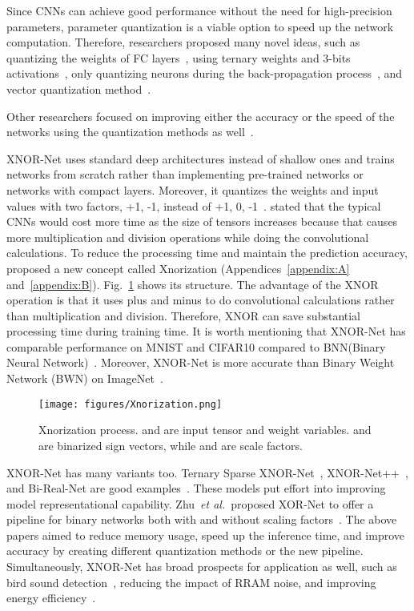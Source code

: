 \documentclass[sn-mathphys,iicol,Numbered]{sn-jnl}
\newcommand{\etal}{\textit{et al.}}
\begin{document}
Since CNNs can achieve good performance without the need for high-precision parameters, parameter quantization is a viable option to speed up the network computation. Therefore, researchers proposed many novel ideas, such as quantizing the weights of FC layers~\citep{A35_Vector_Q}, using ternary weights and 3-bits activations~\citep{A36_fix}, only quantizing neurons during the back-propagation process~\citep{A37_mul}, and vector quantization method~\citep{A47_vec_quant}.

Other researchers focused on improving either the accuracy or the speed of the networks using the quantization methods as well~\cite{A39_grdy, A40_low_bit, A41_prune}.

XNOR-Net uses standard deep architectures instead of shallow ones and trains networks from scratch rather than implementing pre-trained networks or networks with compact layers. Moreover, it quantizes the weights and input values with two factors, +1, -1, instead of +1, 0, -1~\citep{A38_probnd}. \cite{A2_xnor} stated that the typical CNNs would cost more time as the size of tensors increases because that causes more multiplication and division operations while doing the convolutional calculations. To reduce the processing time and maintain the prediction accuracy, \cite{A2_xnor} proposed a new concept called Xnorization (Appendices~\ref{appendix:A} and~\ref{appendix:B}). Fig.~\ref{fig:xnorization} shows its structure. The advantage of the XNOR operation is that it uses plus and minus to do convolutional calculations rather than multiplication and division. Therefore, XNOR can save substantial processing time during training time. It is worth mentioning that XNOR-Net has comparable performance on MNIST and CIFAR10 compared to BNN(Binary Neural Network)~\citep{A2_xnor}. Moreover, XNOR-Net is more accurate than Binary Weight Network (BWN) on ImageNet~\citep{A48_img_net}.

\begin{figure} [ht]
\centering
\caption{Xnorization process.  and  are input tensor and weight variables.  and  are binarized sign vectors, while  and  are scale factors.}
\texttt{[image: figures/Xnorization.png]}
\vspace{-0.3cm}
\label{fig:xnorization}
\end{figure}

XNOR-Net has many variants too. Ternary Sparse XNOR-Net~\cite{A25_ternary_xnor}, XNOR-Net++~\cite{A26_x++}, and Bi-Real-Net are good examples~\citep{A27_Bi_Real}. These models put effort into improving model representational capability. Zhu~\etal~proposed XOR-Net to offer a pipeline for binary networks both with and without scaling factors~\citep{A28_XOR}. The above papers aimed to reduce memory usage, speed up the inference time, and improve accuracy by creating different quantization methods or the new pipeline. Simultaneously, XNOR-Net has broad prospects for application as well, such as bird sound detection~\citep{A57_Bird_Sound_Detection}, reducing the impact of RRAM noise, and improving energy efficiency~\citep{A58_RRAM}.
\end{document}
